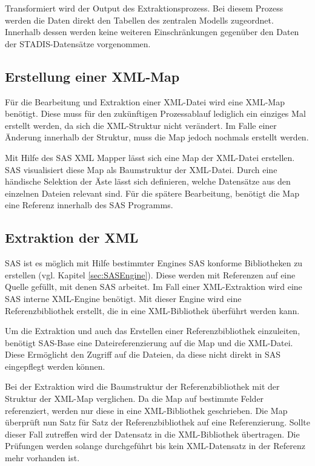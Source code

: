 		Transformiert wird der Output des Extraktionsprozess. 
		Bei diesem Prozess werden die Daten direkt den Tabellen des zentralen Modells zugeordnet.
		Innerhalb dessen werden keine weiteren Einschränkungen gegenüber den Daten der STADIS-Datensätze vorgenommen.
		
	\subsection{Erstellung einer XML-Map}
		Für die Bearbeitung und Extraktion einer XML-Datei wird eine XML-Map benötigt. 
		Diese muss für den zukünftigen Prozessablauf lediglich ein einziges Mal erstellt werden, da sich die XML-Struktur nicht verändert.
		Im Falle einer Änderung innerhalb der Struktur, muss die Map jedoch nochmals erstellt werden.
		
		Mit Hilfe des SAS XML Mapper lässt sich eine Map der XML-Datei erstellen. 
		SAS visualisiert diese Map als Baumstruktur der XML-Datei.
		Durch eine händische Selektion der Äste lässt sich definieren, welche Datensätze aus den einzelnen Dateien relevant sind. 
		Für die spätere Bearbeitung, benötigt die Map eine Referenz innerhalb des SAS Programms.
		 
	\subsection{Extraktion der XML}\label{sec:ExtraktionXML}
		SAS ist es möglich mit Hilfe bestimmter Engines SAS konforme Bibliotheken zu erstellen (vgl. Kapitel \ref{sec:SASEngine}).
		Diese werden mit Referenzen auf eine Quelle gefüllt, mit denen SAS arbeitet.
		Im Fall einer XML-Extraktion wird eine SAS interne XML-Engine benötigt.
		Mit dieser Engine wird eine Referenzbibliothek erstellt, die in eine XML-Bibliothek überführt werden kann.
		
		Um die Extraktion und auch das Erstellen einer Referenzbibliothek einzuleiten, benötigt SAS-Base eine Dateireferenzierung auf die Map und die XML-Datei.
		Diese Ermöglicht den Zugriff auf die Dateien, da diese nicht direkt in SAS eingepflegt werden können.
		
		Bei der Extraktion wird die Baumstruktur der Referenzbibliothek mit der Struktur der XML-Map verglichen.
		Da die Map auf bestimmte Felder referenziert, werden nur diese in eine XML-Bibliothek geschrieben.
		Die Map überprüft nun Satz für Satz der Referenzbibliothek auf eine Referenzierung.
		Sollte dieser Fall zutreffen wird der Datensatz in die XML-Bibliothek übertragen.
		Die Prüfungen werden solange durchgeführt bis kein XML-Datensatz in der Referenz mehr vorhanden ist.
		
